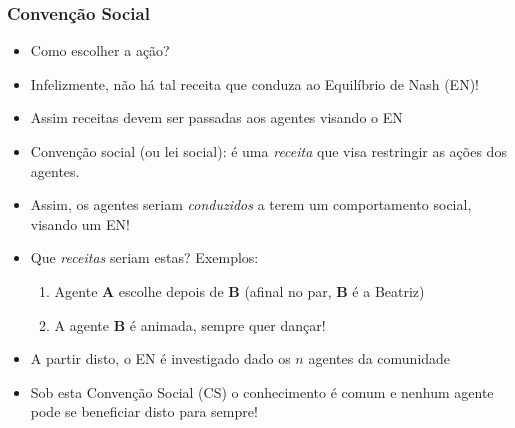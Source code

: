 \begin{frame}%
\frametitle{Convenção Social}

\begin{itemize}
  \item Como escolher a ação?
  \item Infelizmente, não há tal receita que conduza ao Equilíbrio de Nash (EN)!
  \item Assim receitas devem ser passadas aos agentes visando o EN

\pause
  \item Convenção social (ou lei social): é uma \textit{receita} que visa
  restringir as ações  dos agentes.
  
  \item Assim, os agentes seriam \textit{conduzidos} a terem um comportamento
  social, visando um EN!
  
  \item Que \textit{receitas} seriam estas? Exemplos:
  \pause
  \begin{enumerate}
    \item Agente \textbf{A} escolhe depois de \textbf{B} (afinal no par, \textbf{B} é a Beatriz)
    \item A agente \textbf{B} é animada, sempre quer dançar!
  \end{enumerate}
  
\item A partir disto, o EN é investigado dado os $n$ agentes da comunidade


  \item Sob esta Convenção Social (CS) o conhecimento é comum e nenhum agente pode se
  beneficiar disto para sempre!
 
\end{itemize}


\end{frame}


